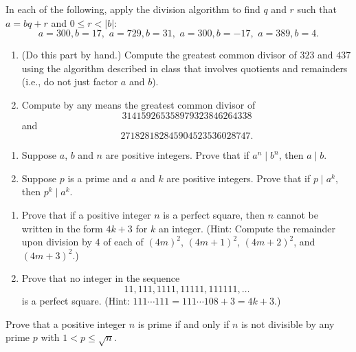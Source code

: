\begin{exercises}
\item
In each of the following, apply the division algorithm
to find $q$ and $r$ such that
$a = bq + r$ and $0\leq r < |b|$:
$$
 a=300, b=17,\,\,
a=729,b=31,\,\,
a=300,b=-17,\,\,
a=389,b=4.
$$

\item
\begin{enumerate}
\item (Do this part  by hand.) Compute the greatest common
  divisor of $323$ and $437$ using the algorithm described in class
  that involves quotients and remainders (i.e., do not just factor $a$
  and $b$).
\item Compute by any means the greatest common divisor of
$$314159265358979323846264338$$ and $$271828182845904523536028747.$$
\end{enumerate}

\item
\begin{enumerate}
\item Suppose $a$, $b$ and $n$ are positive integers. Prove
that if $a^n\mid b^n$, then $a\mid b$.
\item Suppose $p$ is a prime and $a$ and $k$ are positive
integers.  Prove that if $p \mid a^k$, then $p^k \mid a^k$.
\end{enumerate}

\item
\begin{enumerate}
\item  Prove that if a positive integer $n$ is a perfect
square, then $n$ cannot be written in the form $4k+3$
for $k$ an integer.
(Hint: Compute the remainder upon division
by $4$ of each of $(4m)^2$, $(4m+1)^2$, $(4m+2)^2$,
and $(4m+3)^2$.)
\item  Prove that no integer in the sequence
$$
  11, 111, 1111, 11111, 111111, \ldots
$$
is a perfect square.   (Hint: $111\cdots111 = 111\cdots 108 + 3 = 4k+3$.)
\end{enumerate}

\item Prove that a positive integer $n$ is prime if
and only if $n$ is not divisible by any prime $p$
with $1 < p \leq \sqrt{n}$.


\end{exercises}

